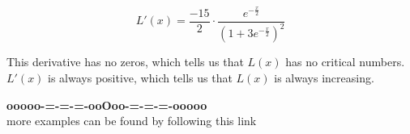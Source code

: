 \documentclass{ximera}
\begin{document}
\[  L'(x) =   \frac{-15}{2} \cdot \frac{e^{-\tfrac{x}{2}}}{\left(1+3 e^{-\tfrac{x}{2}}\right)^2}    \]


This derivative has no zeros, which tells us that $L(x)$ has no critical numbers.  $L'(x)$ is always positive, which tells us that $L(x)$ is always increasing.












\begin{center}
\textbf{\textcolor{green!50!black}{ooooo-=-=-=-ooOoo-=-=-=-ooooo}} \\

more examples can be found by following this link\\ 

\end{center}
\end{document}
